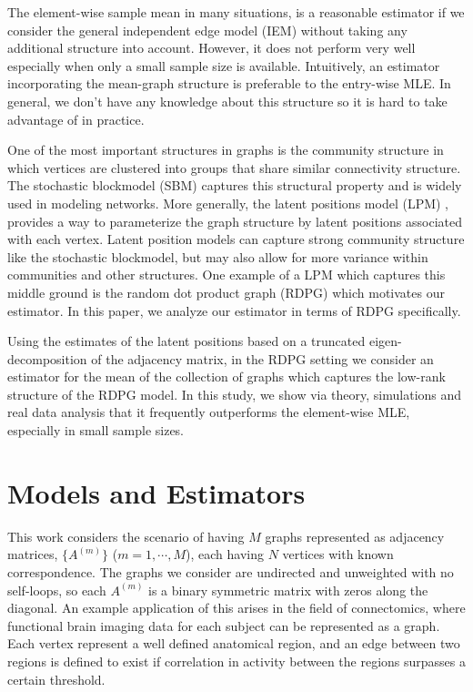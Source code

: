 \documentclass[a4paper]{article}
\begin{document}
The element-wise sample mean in many situations, is a reasonable estimator if we consider the general independent edge model (IEM) \cite{bollobas2007phase} without taking any additional structure into account. 
However, it does not perform very well especially when only a small sample size is available.
Intuitively, an estimator incorporating the mean-graph structure is preferable to the entry-wise MLE. 
In general, we don't have any knowledge about this structure so it is hard to take advantage of in practice.



One of the most important structures in graphs is the community structure in which vertices are clustered into groups that share similar connectivity structure. The stochastic blockmodel (SBM) \cite{holland1983stochastic} captures this structural property and is widely used in modeling networks.
More generally, the latent positions model (LPM) \cite{hoff2002latent}, provides a way to parameterize the graph structure by latent positions associated with each vertex. 
Latent position models can capture strong community structure like the stochastic blockmodel, but may also allow for more variance within communities and other structures.
One example of a LPM which captures this middle ground is the random dot product graph (RDPG) \cite{young2007random, nickel2007random} which motivates our estimator. 
In this paper, we analyze our estimator in terms of RDPG specifically.

Using the estimates of the latent positions based on a truncated eigen-decomposition of the adjacency matrix,  in the RDPG setting we consider an estimator for the mean of the collection of graphs which captures the low-rank structure of the RDPG model. In this study, we show via theory, simulations and real data analysis that it frequently outperforms the element-wise MLE, especially in small sample sizes.





\section{Models and Estimators}
\label{section:model_estimator}
This work considers the scenario of having $M$ graphs represented as adjacency matrices, $\{A^{(m)}\}$ ($m = 1, \cdots, M$), each having $N$ vertices with known correspondence. The graphs we consider are undirected and unweighted with no self-loops, so each $A^{(m)}$ is a binary symmetric matrix with zeros along the diagonal. An example application of this arises in the field of connectomics, where functional brain imaging data for each subject can be represented as a graph.
Each vertex represent a well defined anatomical region, and an edge between two regions is defined to exist if correlation in activity between the regions surpasses a certain threshold.
\end{document}
